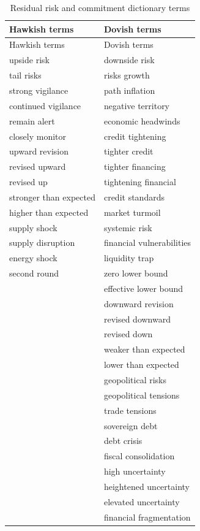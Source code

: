 \begin{longtable}{p{}p{}}
\caption{Residual risk and commitment dictionary terms}\label{tab:a1_residual_terms}\\
\toprule
Hawkish terms & Dovish terms \\
\midrule
\endfirsthead
\toprule
Hawkish terms & Dovish terms \\
\midrule
\endhead
upside risk & downside risk \\
tail risks & risks growth \\
strong vigilance & path inflation \\
continued vigilance & negative territory \\
remain alert & economic headwinds \\
closely monitor & credit tightening \\
upward revision & tighter credit \\
revised upward & tighter financing \\
revised up & tightening financial \\
stronger than expected & credit standards \\
higher than expected & market turmoil \\
supply shock & systemic risk \\
supply disruption & financial vulnerabilities \\
energy shock & liquidity trap \\
second round & zero lower bound \\
 & effective lower bound \\
 & downward revision \\
 & revised downward \\
 & revised down \\
 & weaker than expected \\
 & lower than expected \\
 & geopolitical risks \\
 & geopolitical tensions \\
 & trade tensions \\
 & sovereign debt \\
 & debt crisis \\
 & fiscal consolidation \\
 & high uncertainty \\
 & heightened uncertainty \\
 & elevated uncertainty \\
 & financial fragmentation \\
\bottomrule
\end{longtable}


